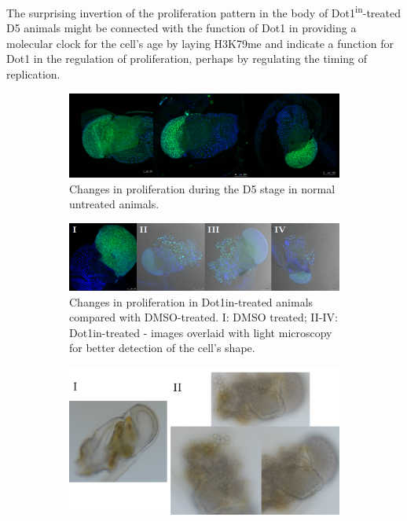 \documentclass[11pt,twoside,a4paper]{report}
\begin{document}
	The surprising invertion of the proliferation pattern in the body of 	Dot1\textsuperscript{in}-treated D5 animals might be connected with the function of Dot1 in providing a molecular clock for the cell's age by laying H3K79me and indicate a function for Dot1 in the regulation of proliferation, perhaps by regulating the timing of replication.
	
	\begin{figure}
		\setlength{\belowcaptionskip}{5pt}
		\centering
		\begin{subfigure}{1\textwidth}
			\centering
			\includegraphics[width=1\linewidth]{pngs/d5_EdU.png}
			\caption{Changes in proliferation during the D5 stage in normal untreated animals.}
		\end{subfigure}
		\begin{subfigure}{1\textwidth}
			\centering
			\includegraphics[width=1\linewidth]{pngs/D5_EdU_dot1in.png}
			\caption{
				Changes in proliferation in Dot1in-treated animals compared with DMSO-treated.
				{\footnotesize
					I: DMSO treated;
					II-IV: Dot1in-treated - images overlaid with light microscopy for better detection of the cell's shape.
				}
			}
		\end{subfigure}
		\begin{subfigure}{0.8\textwidth}
			\centering
			\includegraphics[width=1\linewidth]{pngs/d5_phenotype.png}

\end{subfigure}
\end{figure}
\end{document}
